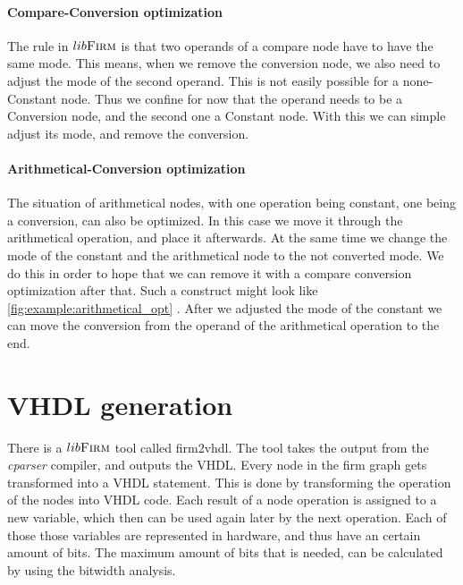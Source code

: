 \paragraph{Compare-Conversion optimization}
The rule in $lib\textsc{Firm}$ is that two operands of a compare node have to have the same mode. This means, when we remove the conversion node, we also need to adjust the mode of the second operand. This is not easily possible for a none-Constant node.
Thus we confine for now that the operand needs to be a Conversion node, and the second one a Constant node. \newline
With this we can simple adjust its mode, and remove the conversion.

\paragraph{Arithmetical-Conversion optimization}

The situation of arithmetical nodes, with one operation being constant, one being a conversion, can also be optimized. In this case we move it through the arithmetical operation, and place it afterwards. At the same time we change the mode of the constant and the arithmetical node to the not converted mode. We do this in order to hope that we can remove it with a compare conversion optimization after that.
Such a construct might look like \autoref{fig:example:arithmetical_opt} . After we adjusted the mode of the constant we can move the conversion from the operand of the arithmetical operation to the end.

\section{VHDL generation}

There is a $lib\textsc{Firm}$ tool called firm2vhdl. The tool takes the output from the \textit{cparser} compiler, and outputs the VHDL. Every node in the firm graph gets transformed into a VHDL statement. This is done by transforming the operation of the nodes into VHDL code. Each result of a node operation is assigned to a new variable, which then can be used again later by the next operation. 
Each of those those variables are represented in hardware, and thus have an certain amount of bits. The maximum amount of bits that is needed, can be calculated by using the bitwidth analysis.

